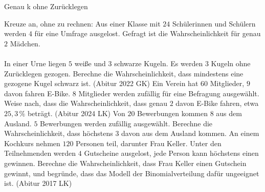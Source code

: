 \setcounter{aufgabe}{6}

\begin{aufgabe}{Genau k ohne Zurücklegen}
\begin{teile}
\teil Kreuze an, ohne zu rechnen: Aus einer Klasse mit $24$ Schülerinnen und Schülern werden $4$ für eine Umfrage ausgelost. Gefragt ist die Wahrscheinlichkeit für genau $2$ Mädchen. \\  \\ 
\teil In einer Urne liegen $5$ weiße und $3$ schwarze Kugeln. Es werden $3$ Kugeln ohne Zurücklegen gezogen. Berechne die Wahrscheinlichkeit, dass mindestens eine gezogene Kugel schwarz ist. \hfill (Abitur 2022 GK)
\teil Ein Verein hat $60$ Mitglieder, $9$ davon fahren E-Bike. $8$ Mitglieder werden zufällig für eine Befragung ausgewählt. Weise nach, dass die Wahrscheinlichkeit, dass genau $2$ davon E-Bike fahren, etwa $25{,}3\,\%$ beträgt. \hfill (Abitur 2024 LK)
\teil Von $20$ Bewerbungen kommen $8$ aus dem Ausland. $5$ Bewerbungen werden zufällig ausgewählt. Berechne die Wahrscheinlichkeit, dass höchstens $3$ davon aus dem Ausland kommen.
\teil An einem Kochkurs nehmen $120$ Personen teil, darunter Frau Keller. Unter den Teilnehmenden werden $4$ Gutscheine ausgelost, jede Person kann höchstens einen gewinnen. Berechne die Wahrscheinlichkeit, dass Frau Keller einen Gutschein gewinnt, und begründe, dass das Modell der Binomialverteilung dafür ungeeignet ist. \hfill (Abitur 2017 LK)
\end{teile}
\end{aufgabe}

